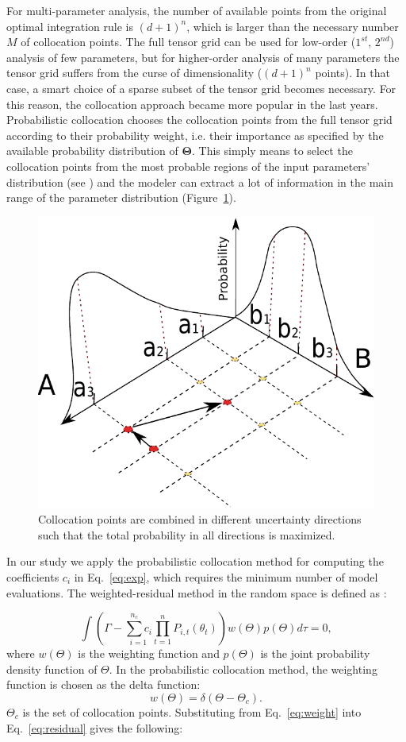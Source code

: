 For multi-parameter analysis, the number of available points from the original optimal integration rule is $(d+1)^n$, which is larger than the necessary number $M$ of collocation points. The full tensor grid can be used for low-order ($1^{st}$, $2^{nd}$) analysis of few parameters, but for higher-order analysis of many parameters the tensor grid suffers from the curse of dimensionality ($(d+1)^n$ points). In that case, a smart choice of a sparse subset of the tensor grid becomes necessary. For this reason, the collocation approach became more popular in the last years. Probabilistic collocation \cite{nLi2007, oladyshkinintegrative,oladyshkin2011concept} chooses the collocation points  from the full tensor grid according to their probability weight, i.e. their importance as specified by the available probability distribution of $\boldsymbol{\Theta}$. This simply means to select the collocation points from the most probable regions of the input parameters' distribution (see \cite{oladyshkinintegrative}) and the modeler can extract a lot of information in the main range of the parameter distribution (Figure~\ref{fig:col}).

\begin{figure}
  \centering
  \includegraphics[width=0.65 \linewidth]{./figurer/col} 
  \caption{Collocation points are combined in different uncertainty directions such that the total probability in all directions is maximized.}
  \label{fig:col}
%
\end{figure}

In our study we apply the probabilistic collocation method for computing the coefficients $c_{i}$ in Eq.~\ref{eq:exp}, which requires the minimum number of model evaluations. The weighted-residual method in the random space is defined as \cite{nLi2007}:

\begin{equation}
\int(\Gamma-\underset{i=1}{\overset{n_c}{\sum}c_{i}}\underset{t=1}{\overset{n}{\prod}}P_{i,t}(\theta_{t}))w(\Theta)p(\Theta)d\tau=0,\label{eq:residual}\end{equation}
where $w(\Theta)$ is the weighting function and $p(\Theta)$ is the joint probability density function of $\Theta$. In the probabilistic collocation method, the weighting function is chosen as the delta function:
\begin{equation}
 w(\Theta) = \delta(\Theta-\Theta_c). \label{eq:weight}
\end{equation}
$\Theta_c$ is the set of collocation points. Substituting from Eq.~\ref{eq:weight} into Eq.~\ref{eq:residual} gives the following:

